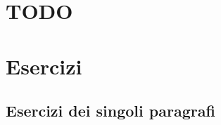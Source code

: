 
\section{TODO}

\section{Esercizi}

\subsection{Esercizi dei singoli paragrafi}

\subsubsection*{}


